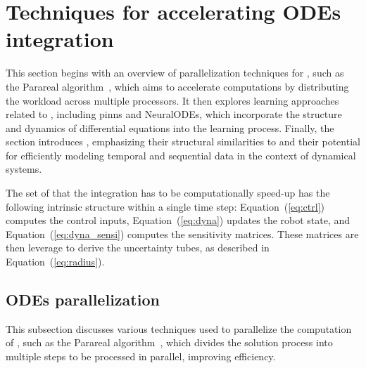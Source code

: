 \section{Techniques for accelerating ODEs integration}\label{sec:learning_overview}

This section begins with an overview of parallelization techniques for , such as the Parareal algorithm~\cite{cParareal}, which aims to accelerate computations by distributing the workload across multiple processors. 
It then explores learning approaches related to , including \gls{pinns} and NeuralODEs, which incorporate the structure and dynamics of differential equations into the learning process. 
Finally, the section introduces , emphasizing their structural similarities to  and their potential for efficiently modeling temporal and sequential data in the context of dynamical systems.

The set of  that the integration has to be computationally speed-up has the following intrinsic structure within a single time step: Equation~(\ref{eq:ctrl}) computes the control inputs, Equation~(\ref{eq:dyna}) updates the robot state, and Equation~(\ref{eq:dyna_sensi}) computes the sensitivity matrices.
These matrices are then leverage to derive the uncertainty tubes, as described in Equation~(\ref{eq:radius}).

\subsection{ODEs parallelization}

This subsection discusses various techniques used to parallelize the computation of , such as the Parareal algorithm~\cite{cParareal}, which divides the solution process into multiple steps to be processed in parallel, improving efficiency.

